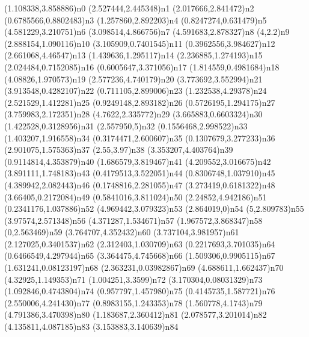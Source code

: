 \pnode(1.108338,3.858886){n0}
\pnode(2.527444,2.445348){n1}
\pnode(2.017666,2.841472){n2}
\pnode(0.6785566,0.8802483){n3}
\pnode(1.257860,2.892203){n4}
\pnode(0.8247274,0.631479){n5}
\pnode(4.581229,3.210751){n6}
\pnode(3.098514,4.866756){n7}
\pnode(4.591683,2.878327){n8}
\pnode(4,2.2){n9}
\pnode(2.888154,1.090116){n10}
\pnode(3.105909,0.7401545){n11}
\pnode(0.3962556,3.984627){n12}
\pnode(2.661068,4.46547){n13}
\pnode(1.439636,1.295117){n14}
\pnode(2.236885,1.274193){n15}
\pnode(2.024484,0.7152085){n16}
\pnode(0.6005647,3.371056){n17}
\pnode(1.814559,0.4981684){n18}
\pnode(4.08826,1.970573){n19}
\pnode(2.577236,4.740179){n20}
\pnode(3.773692,3.552994){n21}
\pnode(3.913548,0.4282107){n22}
\pnode(0.711105,2.899006){n23}
\pnode(1.232538,4.29378){n24}
\pnode(2.521529,1.412281){n25}
\pnode(0.9249148,2.893182){n26}
\pnode(0.5726195,1.294175){n27}
\pnode(3.759983,2.172351){n28}
\pnode(4.7622,2.335772){n29}
\pnode(3.665883,0.6603324){n30}
\pnode(1.422528,0.3128956){n31}
\pnode(2.557950,5){n32}
\pnode(0.1556468,2.998522){n33}
\pnode(1.403207,1.916558){n34}
\pnode(0.3174471,2.600607){n35}
\pnode(0.1307679,3.277233){n36}
\pnode(2.901075,1.575363){n37}
\pnode(2.55,3.97){n38}
\pnode(3.353207,4.403764){n39}
\pnode(0.9114814,4.353879){n40}
\pnode(1.686579,3.819467){n41}
\pnode(4.209552,3.016675){n42}
\pnode(3.891111,1.748183){n43}
\pnode(0.4179513,3.522051){n44}
\pnode(0.8306748,1.037910){n45}
\pnode(4.389942,2.082443){n46}
\pnode(0.1748816,2.281055){n47}
\pnode(3.273419,0.6181322){n48}
\pnode(3.66405,0.2172084){n49}
\pnode(0.5841016,3.811024){n50}
\pnode(2.24852,4.942186){n51}
\pnode(0.2341176,1.037886){n52}
\pnode(4.969442,3.079323){n53}
\pnode(2.864019,0){n54}
\pnode(5,2.809783){n55}
\pnode(3.97574,2.571348){n56}
\pnode(4.371287,1.534671){n57}
\pnode(1.967572,3.868347){n58}
\pnode(0,2.563469){n59}
\pnode(3.764707,4.352432){n60}
\pnode(3.737104,3.981957){n61}
\pnode(2.127025,0.3401537){n62}
\pnode(2.312403,1.030709){n63}
\pnode(0.2217693,3.701035){n64}
\pnode(0.6466549,4.297944){n65}
\pnode(3.364475,4.745668){n66}
\pnode(1.509306,0.9905115){n67}
\pnode(1.631241,0.08123197){n68}
\pnode(2.363231,0.03982867){n69}
\pnode(4.688611,1.662437){n70}
\pnode(4.32925,1.149353){n71}
\pnode(1.004251,3.3599){n72}
\pnode(3.170304,0.08031329){n73}
\pnode(1.092846,0.4743804){n74}
\pnode(0.957797,1.457980){n75}
\pnode(0.4145735,1.587721){n76}
\pnode(2.550006,4.241430){n77}
\pnode(0.8983155,1.243353){n78}
\pnode(1.560778,4.1743){n79}
\pnode(4.791386,3.470398){n80}
\pnode(1.183687,2.360412){n81}
\pnode(2.078577,3.201014){n82}
\pnode(4.135811,4.087185){n83}
\pnode(3.153883,3.140639){n84}
